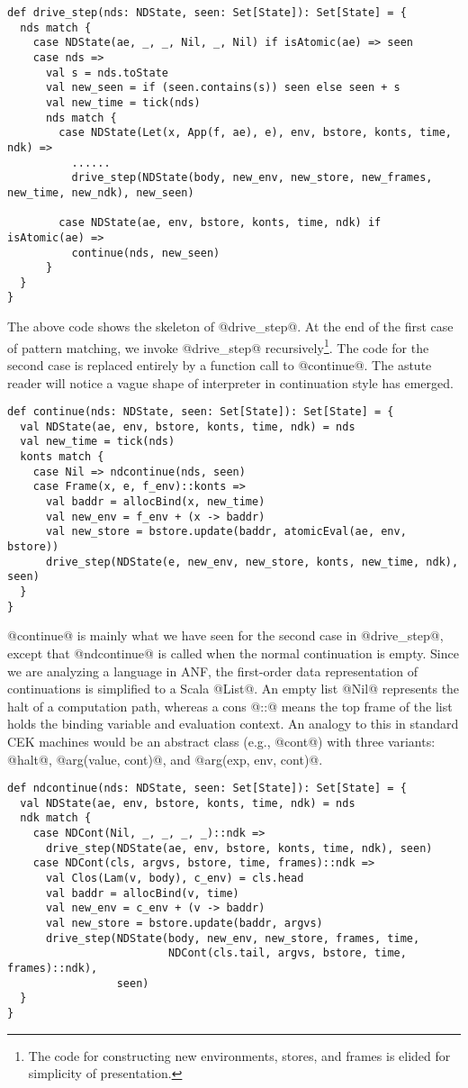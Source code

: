 \documentclass[acmsmall,review,anonymous]{acmart}\settopmatter{printfolios=true,printccs=false,printacmref=false}
\begin{document}
\begin{lstlisting}
def drive_step(nds: NDState, seen: Set[State]): Set[State] = {
  nds match {
    case NDState(ae, _, _, Nil, _, Nil) if isAtomic(ae) => seen
    case nds =>
      val s = nds.toState
      val new_seen = if (seen.contains(s)) seen else seen + s
      val new_time = tick(nds)
      nds match {
        case NDState(Let(x, App(f, ae), e), env, bstore, konts, time, ndk) =>
          ......
          drive_step(NDState(body, new_env, new_store, new_frames, new_time, new_ndk), new_seen)

        case NDState(ae, env, bstore, konts, time, ndk) if isAtomic(ae) =>
          continue(nds, new_seen)
      }
  }
}
\end{lstlisting}

The above code shows the skeleton of @drive_step@.
At the end of the first case of pattern matching, we invoke @drive_step@ recursively\footnote{The code for constructing new environments, stores, and frames is elided for simplicity of presentation.}.
The code for the second case is replaced entirely by a function call to @continue@.
The astute reader will notice a vague shape of interpreter in continuation style has emerged.

\begin{lstlisting}
def continue(nds: NDState, seen: Set[State]): Set[State] = {
  val NDState(ae, env, bstore, konts, time, ndk) = nds
  val new_time = tick(nds)
  konts match {
    case Nil => ndcontinue(nds, seen)
    case Frame(x, e, f_env)::konts =>
      val baddr = allocBind(x, new_time)
      val new_env = f_env + (x -> baddr)
      val new_store = bstore.update(baddr, atomicEval(ae, env, bstore))
      drive_step(NDState(e, new_env, new_store, konts, new_time, ndk), seen)
  }
}
\end{lstlisting}

@continue@ is mainly what we have seen for the second case in
@drive_step@, except that @ndcontinue@ is called when
the normal continuation is empty.
Since we are analyzing a language in ANF, the first-order data representation of
continuations is simplified to a Scala @List@.
An empty list @Nil@ represents the halt of a computation path, whereas
a cons @::@ means the top frame of the list holds the binding variable and
evaluation context.
An analogy to this in standard CEK machines would be an abstract class (e.g., @cont@) with
three variants: @halt@, @arg(value, cont)@, and @arg(exp, env, cont)@.

\begin{lstlisting}
def ndcontinue(nds: NDState, seen: Set[State]): Set[State] = {
  val NDState(ae, env, bstore, konts, time, ndk) = nds
  ndk match {
    case NDCont(Nil, _, _, _, _)::ndk =>
      drive_step(NDState(ae, env, bstore, konts, time, ndk), seen)
    case NDCont(cls, argvs, bstore, time, frames)::ndk =>
      val Clos(Lam(v, body), c_env) = cls.head
      val baddr = allocBind(v, time)
      val new_env = c_env + (v -> baddr)
      val new_store = bstore.update(baddr, argvs)
      drive_step(NDState(body, new_env, new_store, frames, time,
                         NDCont(cls.tail, argvs, bstore, time, frames)::ndk),
                 seen)
  }
}
\end{lstlisting}
\end{document}
